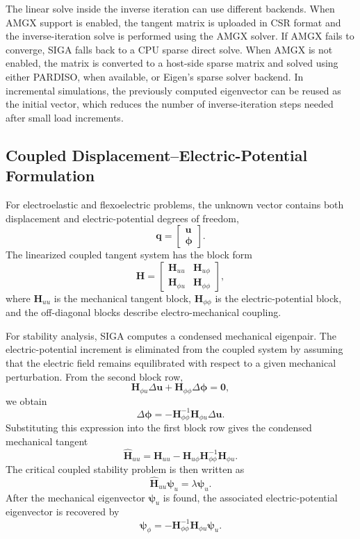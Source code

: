 \documentclass[11pt]{article}
\begin{document}
The linear solve inside the inverse iteration can use different backends. When AMGX support is enabled, the tangent matrix is uploaded in CSR format and the inverse-iteration solve is performed using the AMGX solver. If AMGX fails to converge, SIGA falls back to a CPU sparse direct solve. When AMGX is not enabled, the matrix is converted to a host-side sparse matrix and solved using either PARDISO, when available, or Eigen's sparse solver backend. In incremental simulations, the previously computed eigenvector can be reused as the initial vector, which reduces the number of inverse-iteration steps needed after small load increments.

\subsection{Coupled Displacement--Electric-Potential Formulation}

For electroelastic and flexoelectric problems, the unknown vector contains both displacement and electric-potential degrees of freedom,
\[
    \mathbf{q}
    =
    \begin{bmatrix}
    \mathbf{u} \\
    \boldsymbol{\phi}
    \end{bmatrix}.
\]
The linearized coupled tangent system has the block form
\[
    \mathbf{H}
    =
    \begin{bmatrix}
    \mathbf{H}_{uu} & \mathbf{H}_{u\phi} \\
    \mathbf{H}_{\phi u} & \mathbf{H}_{\phi\phi}
    \end{bmatrix},
\]
where \(\mathbf{H}_{uu}\) is the mechanical tangent block, \(\mathbf{H}_{\phi\phi}\) is the electric-potential block, and the off-diagonal blocks describe electro-mechanical coupling.

For stability analysis, SIGA computes a condensed mechanical eigenpair. The electric-potential increment is eliminated from the coupled system by assuming that the electric field remains equilibrated with respect to a given mechanical perturbation. From the second block row,
\[
    \mathbf{H}_{\phi u}\Delta \mathbf{u}
    +
    \mathbf{H}_{\phi\phi}\Delta \boldsymbol{\phi}
    =
    \mathbf{0},
\]
we obtain
\[
    \Delta \boldsymbol{\phi}
    =
    -
    \mathbf{H}_{\phi\phi}^{-1}
    \mathbf{H}_{\phi u}\Delta \mathbf{u}.
\]
Substituting this expression into the first block row gives the condensed mechanical tangent
\[
    \widehat{\mathbf{H}}_{uu}
    =
    \mathbf{H}_{uu}
    -
    \mathbf{H}_{u\phi}
    \mathbf{H}_{\phi\phi}^{-1}
    \mathbf{H}_{\phi u}.
\]
The critical coupled stability problem is then written as
\[
    \widehat{\mathbf{H}}_{uu}\boldsymbol{\psi}_{u}
    =
    \lambda \boldsymbol{\psi}_{u}.
\]
After the mechanical eigenvector \(\boldsymbol{\psi}_{u}\) is found, the associated electric-potential eigenvector is recovered by
\[
    \boldsymbol{\psi}_{\phi}
    =
    -
    \mathbf{H}_{\phi\phi}^{-1}
    \mathbf{H}_{\phi u}
    \boldsymbol{\psi}_{u}.
\]
\end{document}

